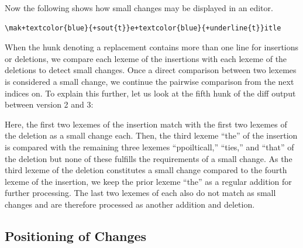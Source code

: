 
Now the following shows how small changes may be displayed in an editor.  

\begin{Verbatim}[frame=lines,label={Markup of a small change},samepage=true,showspaces=true,commandchars=+\{\}]
\mak+textcolor{blue}{+sout{t}}e+textcolor{blue}{+underline{t}}itle
\end{Verbatim}

When the hunk denoting a replacement contains more than one line for insertions or deletions, we compare each lexeme of the insertions with each lexeme of the deletions to detect small changes.  Once a direct comparison between two lexemes is considered a small change, we continue the pairwise comparison from the next indices on.  To explain this further, let us look at the fifth hunk of the diff output between version 2 and 3:


Here, the first two lexemes of the insertion match with the first two lexemes of the deletion as a small change each.  Then, the third lexeme ``the'' of the insertion is compared with the remaining three lexemes ``ppoilticall,'' ``ties,'' and ``that'' of the deletion but none of these fulfills the requirements of a small change.  As the third lexeme of the deletion constitutes a small change compared to the fourth lexeme of the insertion, we keep the prior lexeme ``the'' as a regular addition for further processing.  The last two lexemes of each also do not match as small changes and are therefore processed as another addition and deletion.

\subsection{Positioning of Changes}

